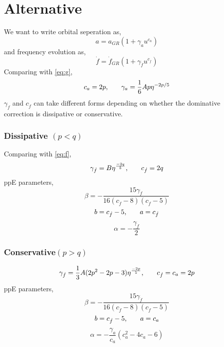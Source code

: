 \documentclass[11pt]{article}
\begin{document}
 \section*{Alternative}
 \hspace*{15.5pt}We want to write orbital seperation as,
 \begin{equation}
 a=a_{GR}(1+\gamma_au^{c_a})
 \end{equation}
and frequency evolution as,
\begin{equation}
\dot{f}=\dot{f}_{GR}(1+\gamma_{\dot{f}}u^{c_{\dot{f}}})
\end{equation} 
Comparing with \eqref{eq:g},
\begin{equation}
c_{a}=2p \text{,\hspace{20pt}}\gamma_a=\frac{1}{6}Ap\eta^{-2p/5}
\end{equation}
\hspace*{15.5pt}$\gamma_{\dot{f}}$ and $c_{\dot{f}}$ can take different forms depending on whether the dominative correction is dissipative or conservative.
\subsubsection*{Dissipative $(p<q)$}
\hspace*{15.5pt}Comparing with \eqref{eq:f},
\begin{equation}
\gamma_{\dot{f}}=B\eta^\frac{-2q}{5}\text{,\hspace*{20pt}}c_{\dot{f}}=2q
\end{equation}
ppE parameters,
\begin{equation}
\beta=-\frac{15 \text{$\gamma_{\dot{f}} $}}{16 (\text{$c_{\dot{f}}$}-8) (\text{$c_{\dot{f}}$}-5)}
\end{equation}
\begin{equation}
b=c_{\dot{f}}-5\text{,\hspace*{20pt}}a=c_{\dot{f}}
\end{equation}
\begin{equation}
\alpha=-\frac{\gamma_{\dot{f}}}{2}
\end{equation}
\subsubsection*{Conservative$(p>q)$}
\begin{equation}
\gamma_{\dot{f}}=\frac{1}{3}A(2p^2-2p-3)\eta^{\frac{-2p}{5}}\text{,\hspace*{20pt}}c_{\dot{f}}=c_a=2p
\end{equation}
ppE parameters,
\begin{equation}
\beta=-\frac{15 \gamma_{\dot{f}} }{16 (c_{\dot{f}}-8) (c_{\dot{f}}-5)}
\end{equation}
\begin{equation}
b=c_{\dot{f}}-5\text{,\hspace*{20pt}}a=c_a
\end{equation}
\begin{equation}
\alpha=-\frac{\gamma_a}{c_a}(c_a^2-4 c_a-6)
\end{equation}
\end{document}
